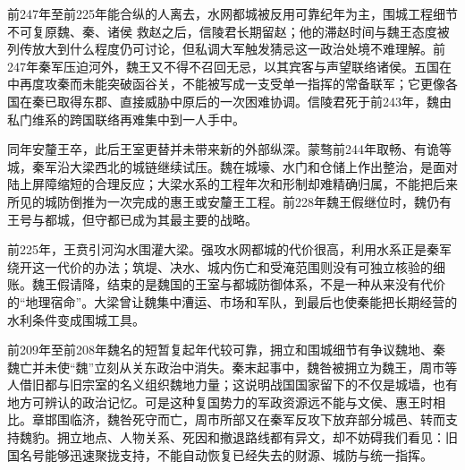 \begin{event}{前247年至前225年}{能合纵的人离去，水网都城被反用}{可靠纪年为主，围城工程细节不可复原}{魏、秦、诸侯}
救赵之后，信陵君长期留赵；他的滞赵时间与魏王态度被列传放大到什么程度仍可讨论，但私调大军触发猜忌这一政治处境不难理解。前247年秦军压迫河外，魏王又不得不召回无忌，以其宾客与声望联络诸侯。五国在中再度攻秦而未能突破函谷关，不能被写成一支受单一指挥的常备联军；它更像各国在秦已取得东郡、直接威胁中原后的一次困难协调。信陵君死于前243年，魏由私门维系的跨国联络再难集中到一人手中。

同年安釐王卒，此后王室更替并未带来新的外部纵深。蒙骜前244年取畅、有诡等城，秦军沿大梁西北的城链继续试压。魏在城壕、水门和仓储上作出整治，是面对陆上屏障缩短的合理反应；大梁水系的工程年次和形制却难精确归属，不能把后来所见的城防倒推为一次完成的惠王或安釐王工程。前228年魏王假继位时，魏仍有王号与都城，但守都已成为其最主要的战略。

前225年，王贲引河沟水围灌大梁。强攻水网都城的代价很高，利用水系正是秦军绕开这一代价的办法；筑堤、决水、城内伤亡和受淹范围则没有可独立核验的细账。魏王假请降，结束的是魏国的王室与都城防御体系，不是一种从来没有代价的“地理宿命”。大梁曾让魏集中漕运、市场和军队，到最后也使秦能把长期经营的水利条件变成围城工具。
\end{event}

\begin{event}{前209年至前208年}{魏名的短暂复起}{年代较可靠，拥立和围城细节有争议}{魏地、秦}
魏亡并未使“魏”立刻从关东政治中消失。秦末起事中，魏咎被拥立为魏王，周市等人借旧都与旧宗室的名义组织魏地力量；这说明战国国家留下的不仅是城墙，也有地方可辨认的政治记忆。可是这种复国势力的军政资源远不能与文侯、惠王时相比。章邯围临济，魏咎死守而亡，周市所部又在秦军反攻下放弃部分城邑、转而支持魏豹。拥立地点、人物关系、死因和撤退路线都有异文，却不妨碍我们看见：旧国名号能够迅速聚拢支持，不能自动恢复已经失去的财源、城防与统一指挥。
\end{event}

